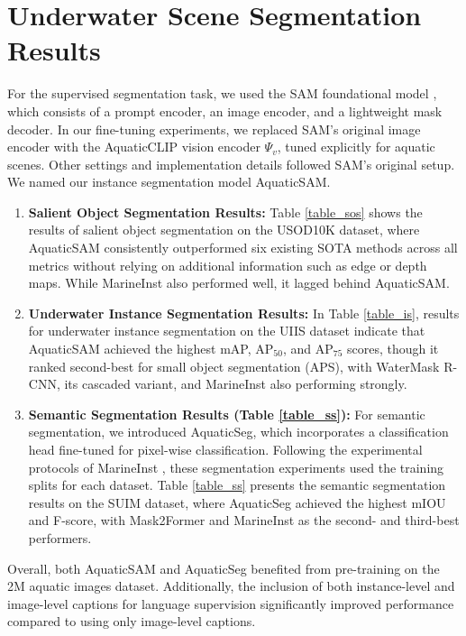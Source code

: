 \section{Underwater Scene Segmentation Results}
\label{segmentation}
For the supervised segmentation task, we used the SAM foundational model \cite{Kirillov_2023_ICCV_SAM}, which consists of a prompt encoder, an image encoder, and a lightweight mask decoder. 
In our fine-tuning experiments, we replaced SAM’s original image encoder with the AquaticCLIP vision encoder $\Psi_{v}$, tuned explicitly for aquatic scenes. 
Other settings and implementation details followed SAM’s original setup. 
We named our instance segmentation model AquaticSAM.

\begin{enumerate}
    \item \textbf{Salient Object Segmentation Results:} Table \ref{table_sos} shows the results of salient object segmentation on the USOD10K \cite{usod10k} dataset, where AquaticSAM consistently outperformed six existing SOTA methods across all metrics without relying on additional information such as edge or depth maps. 
While MarineInst also performed well, it lagged behind AquaticSAM. 

\item \textbf{Underwater Instance Segmentation Results:} In Table \ref{table_is}, results for underwater instance segmentation on the UIIS \cite{Lian_2023_ICCV} dataset indicate that AquaticSAM achieved the highest mAP, AP$_{50}$, and AP$_{75}$ scores, though it ranked second-best for small object segmentation (APS), with WaterMask R-CNN, its cascaded variant, and MarineInst also performing strongly.

\item \textbf{Semantic Segmentation Results (Table \ref{table_ss}):} For semantic segmentation, we introduced AquaticSeg, which incorporates a classification head fine-tuned for pixel-wise classification. 
Following the experimental protocols of MarineInst \cite{ziqiang2024marineinst}, these segmentation experiments used the training splits for each dataset. 
Table \ref{table_ss} presents the semantic segmentation results on the SUIM \cite{islam2020suim} dataset, where AquaticSeg achieved the highest mIOU and F-score, with Mask2Former and MarineInst as the second- and third-best performers.
\end{enumerate}

\noindent Overall, both AquaticSAM and AquaticSeg benefited from pre-training on the 2M aquatic images dataset. 
Additionally, the inclusion of both instance-level and image-level captions for language supervision significantly improved performance compared to using only image-level captions.




